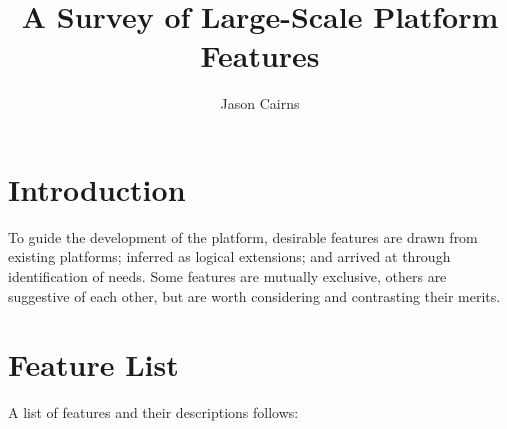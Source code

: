 \documentclass[a4paper,10pt]{article}
\begin{document}
\title{A Survey of Large-Scale Platform Features}
\author{Jason Cairns}
  
\maketitle

\section{Introduction}\label{sec:intro}

To guide the development of the platform, desirable features are drawn from
existing platforms; inferred as logical extensions; and arrived at through
identification of needs. Some features are mutually exclusive, others are
suggestive of each other, but are worth considering and contrasting their
merits.

\section{Feature List}\label{sec:feature-list}

A list of features and their descriptions follows:
\end{document}
